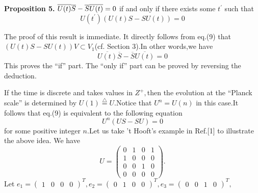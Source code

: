 \documentclass[a4paper,12pt]{article}
\begin{document}
\textbf{Proposition 5.} $\overline{U(t)}\overline{S}-\overline{S}\overline{%
U(t)}=0$ if and only if there exists some $t^{\prime }$ such that
\begin{equation}
U(t^{\prime })(U(t)S-SU(t))=0
\end{equation}

The proof of this result is immediate. It directly follows from eq.(9) that $%
(U(t)S-SU(t))V\subset V_1$(cf. Section 3).In other words,we have
\begin{equation}
\overline{U(t)}\overline{S}-\overline{S}\overline{U(t)}=0
\end{equation}
This proves the ``if'' part. The ``only if'' part can be proved by reversing
the deduction.

If the time is discrete and takes values in $Z^{+},$then the evolution at
the ``Planck scale'' is determined by $U(1)\stackrel{\triangle}{=} U.$Notice
that $U^n=U(n)$ in this case.It follows that eq.(9) is equivalent to the
following equation
\begin{equation}
U^n(US-SU)=0
\end{equation}
for some positive integer $n.$Let us take 't Hooft's example in Ref.[1] to
illustrate the above idea. We have
\begin{equation}
U=\left(
\begin{array}{cccc}
0 & 1 & 0 & 1 \\
1 & 0 & 0 & 0 \\
0 & 0 & 1 & 0 \\
0 & 0 & 0 & 0
\end{array}
\right) .
\end{equation}
Let $e_1=\left(
\begin{array}{cccc}
1 & 0 & 0 & 0
\end{array}
\right) ^T,e_2=\left(
\begin{array}{cccc}
0 & 1 & 0 & 0
\end{array}
\right) ^T,e_3=\left(
\begin{array}{cccc}
0 & 0 & 1 & 0
\end{array}
\right) ^T,$
\end{document}
